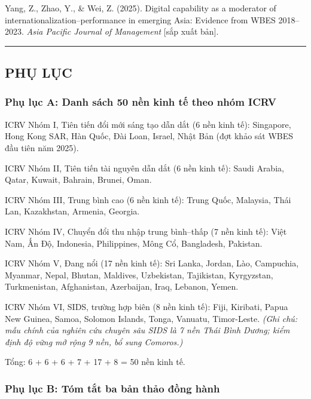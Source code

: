 \documentclass[
  a4paper,
  13pt]{extreport}
\begin{document}
Yang, Z., Zhao, Y., \& Wei, Z. (2025). Digital capability as a moderator
of internationalization--performance in emerging Asia: Evidence from
WBES 2018--2023. \emph{Asia Pacific Journal of Management} {[}sắp xuất
bản{]}.

\begin{center}\rule{0.5\linewidth}{0.5pt}\end{center}

\hypertarget{phux1ee5-lux1ee5c}{%
\subsection{PHỤ LỤC}\label{phux1ee5-lux1ee5c}}

\hypertarget{phux1ee5-lux1ee5c-a-danh-suxe1ch-50-nux1ec1n-kinh-tux1ebf-theo-nhuxf3m-icrv}{%
\subsubsection{Phụ lục A: Danh sách 50 nền kinh tế theo nhóm
ICRV}\label{phux1ee5-lux1ee5c-a-danh-suxe1ch-50-nux1ec1n-kinh-tux1ebf-theo-nhuxf3m-icrv}}

ICRV Nhóm I, Tiên tiến đổi mới sáng tạo dẫn dắt (6 nền kinh tế):
Singapore, Hong Kong SAR, Hàn Quốc, Đài Loan, Israel, Nhật Bản (đợt khảo
sát WBES đầu tiên năm 2025).

ICRV Nhóm II, Tiên tiến tài nguyên dẫn dắt (6 nền kinh tế): Saudi
Arabia, Qatar, Kuwait, Bahrain, Brunei, Oman.

ICRV Nhóm III, Trung bình cao (6 nền kinh tế): Trung Quốc, Malaysia,
Thái Lan, Kazakhstan, Armenia, Georgia.

ICRV Nhóm IV, Chuyển đổi thu nhập trung bình--thấp (7 nền kinh tế): Việt
Nam, Ấn Độ, Indonesia, Philippines, Mông Cổ, Bangladesh, Pakistan.

ICRV Nhóm V, Đang nổi (17 nền kinh tế): Sri Lanka, Jordan, Lào,
Campuchia, Myanmar, Nepal, Bhutan, Maldives, Uzbekistan, Tajikistan,
Kyrgyzstan, Turkmenistan, Afghanistan, Azerbaijan, Iraq, Lebanon, Yemen.

ICRV Nhóm VI, SIDS, trường hợp biên (8 nền kinh tế): Fiji, Kiribati,
Papua New Guinea, Samoa, Solomon Islands, Tonga, Vanuatu, Timor-Leste.
\emph{(Ghi chú: mẫu chính của nghiên cứu chuyên sâu SIDS là 7 nền Thái
Bình Dương; kiểm định độ vững mở rộng 9 nền, bổ sung Comoros.)}

Tổng: 6 + 6 + 6 + 7 + 17 + 8 = 50 nền kinh tế.

\hypertarget{phux1ee5-lux1ee5c-b-tuxf3m-tux1eaft-ba-bux1ea3n-thux1ea3o-ux111ux1ed3ng-huxe0nh}{%
\subsubsection{Phụ lục B: Tóm tắt ba bản thảo đồng
hành}\label{phux1ee5-lux1ee5c-b-tuxf3m-tux1eaft-ba-bux1ea3n-thux1ea3o-ux111ux1ed3ng-huxe0nh}}
\end{document}
